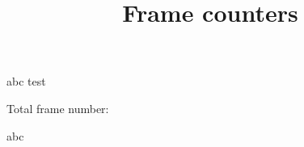 \documentclass{ltx-talk}
\title{Frame counters}
\begin{document}
\begin{frame}
  abc
  \pause
  test
\end{frame}

\begin{frame}
  Total frame number: 
\end{frame}

\begin{frame}
  abc
\end{frame}
\end{document}
